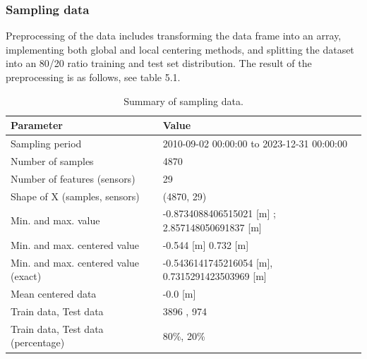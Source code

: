 \subsubsection{Sampling data}
Preprocessing of the data includes transforming the data frame into an array, implementing both global and local centering methods, and splitting the dataset into an 80/20 ratio training and test set distribution. The result of the preprocessing is as follows, see table 5.1.
\begin{table}[htbp]
\centering
\caption{Summary of sampling data.}
\label{tab:sampling_data}
\begin{tabular}{|l|l|}
\hline
\textbf{Parameter}                           & \textbf{Value}                                \\ \hline
Sampling period                              & 2010-09-02 00:00:00 to 2023-12-31 00:00:00   \\ \hline
Number of samples                            & 4870                                          \\ \hline
Number of features (sensors)                 & 29                                            \\ \hline
Shape of X (samples, sensors)                & (4870, 29)                                    \\ \hline
Min. and max. value                          & -0.8734088406515021 [m] ; 2.857148050691837 [m] \\ \hline
Min. and max. centered value                 & -0.544 [m] 0.732 [m]                         \\ \hline
Min. and max. centered value (exact)         & -0.5436141745216054 [m], 0.7315291423503969 [m] \\ \hline
Mean centered data                           & -0.0 [m]                                     \\ \hline
Train data, Test data                        & 3896 , 974                                   \\ \hline
Train data, Test data (percentage)           & 80\%, 20\%                                  \\ \hline
\end{tabular}
\end{table} 

